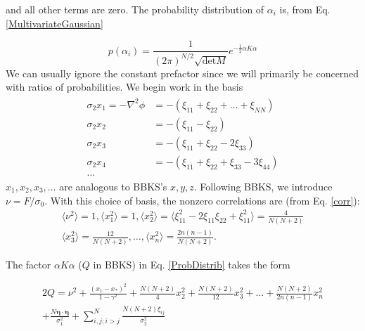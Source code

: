 \documentclass[12pt]{article}
\begin{document}
\noindent and all other terms are zero. The probability distribution of $\alpha_i$ is, from Eq. \ref{MultivariateGaussian}

\begin{equation} \label{ProbDistrib}
p(\alpha_i)=\frac{1}{(2\pi)^{N/2}\sqrt{\mathrm{det}M}} e^{-\frac{1}{2}\alpha K \alpha}
\end{equation}
%
We can usually ignore the constant prefactor since we will primarily be concerned with ratios of probabilities.  We begin work in the basis
%
\begin{align*}
\begin{split}
\sigma_2x_1 = -\nabla^2\phi &= -(\xi_{11}+\xi_{22}+\ldots+\xi_{NN})\\
\sigma_2x_2 &= -(\xi_{11}-\xi_{22})\\
\sigma_2x_3 &= -(\xi_{11}+\xi_{22}-2\xi_{33})\\
\sigma_2x_4 &= -(\xi_{11}+\xi_{22}+\xi_{33}-3\xi_{44})\\
\ldots
\end{split}
\end{align*}
%
$x_1, x_2, x_3, \ldots$ are analogous to BBKS's $x, y, z$. Following BBKS, we introduce $\nu = F/\sigma_0$. With this choice of basis, the nonzero correlations are (from Eq. \ref{corr}):
%
\begin{gather}
\langle\nu^2\rangle = 1, \langle x_1^2\rangle=1, \langle x_2^2 \rangle = \langle \xi_{11}^2 -2\xi_{11}\xi_{22} + \xi_{11}^2\rangle = \frac{4}{N(N+2)} \\
\langle x_3^2 \rangle = \frac{12}{N(N+2)}, \ldots, \langle x_n^2 \rangle = \frac{2n(n-1)}{N(N+2)}.
\end{gather}

The factor $\alpha K \alpha$ ($Q$ in BBKS) in Eq. \ref{ProbDistrib} takes the form

\begin{equation} \label{Q}
\begin{split}
2Q = \nu^2 + \frac{(x_1-x_*)^2}{1-\gamma^2} + \frac{N(N+2)}{4}x_2^2 + \frac{N(N+2)}{12}x_3^2 + \ldots + \frac{N(N+2)}{2n(n-1)}x_n^2 \\ + \frac{N \pmb{\eta}\cdot \pmb{\eta}}{\sigma_1^2} + \sum_{i,j;i > j}^N\frac{N(N+2)\xi_{ij}}{\sigma_2^2}
\end{split}
\end{equation}
\end{document}
